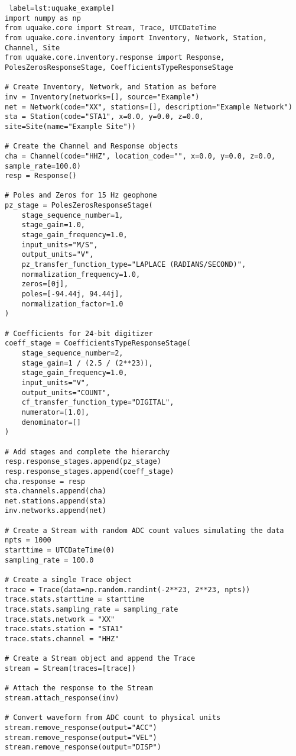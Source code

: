 \begin{verbatim} label=lst:uquake_example]
import numpy as np
from uquake.core import Stream, Trace, UTCDateTime
from uquake.core.inventory import Inventory, Network, Station, Channel, Site
from uquake.core.inventory.response import Response, PolesZerosResponseStage, CoefficientsTypeResponseStage

# Create Inventory, Network, and Station as before
inv = Inventory(networks=[], source="Example")
net = Network(code="XX", stations=[], description="Example Network")
sta = Station(code="STA1", x=0.0, y=0.0, z=0.0, site=Site(name="Example Site"))

# Create the Channel and Response objects
cha = Channel(code="HHZ", location_code="", x=0.0, y=0.0, z=0.0, sample_rate=100.0)
resp = Response()

# Poles and Zeros for 15 Hz geophone
pz_stage = PolesZerosResponseStage(
    stage_sequence_number=1,
    stage_gain=1.0,
    stage_gain_frequency=1.0,
    input_units="M/S",
    output_units="V",
    pz_transfer_function_type="LAPLACE (RADIANS/SECOND)",
    normalization_frequency=1.0,
    zeros=[0j],
    poles=[-94.44j, 94.44j],
    normalization_factor=1.0
)

# Coefficients for 24-bit digitizer
coeff_stage = CoefficientsTypeResponseStage(
    stage_sequence_number=2,
    stage_gain=1 / (2.5 / (2**23)),
    stage_gain_frequency=1.0,
    input_units="V",
    output_units="COUNT",
    cf_transfer_function_type="DIGITAL",
    numerator=[1.0],
    denominator=[]
)

# Add stages and complete the hierarchy
resp.response_stages.append(pz_stage)
resp.response_stages.append(coeff_stage)
cha.response = resp
sta.channels.append(cha)
net.stations.append(sta)
inv.networks.append(net)

# Create a Stream with random ADC count values simulating the data
npts = 1000
starttime = UTCDateTime(0)
sampling_rate = 100.0

# Create a single Trace object
trace = Trace(data=np.random.randint(-2**23, 2**23, npts))
trace.stats.starttime = starttime
trace.stats.sampling_rate = sampling_rate
trace.stats.network = "XX"
trace.stats.station = "STA1"
trace.stats.channel = "HHZ"

# Create a Stream object and append the Trace
stream = Stream(traces=[trace])

# Attach the response to the Stream
stream.attach_response(inv)

# Convert waveform from ADC count to physical units
stream.remove_response(output="ACC")
stream.remove_response(output="VEL")
stream.remove_response(output="DISP")
\end{verbatim}

